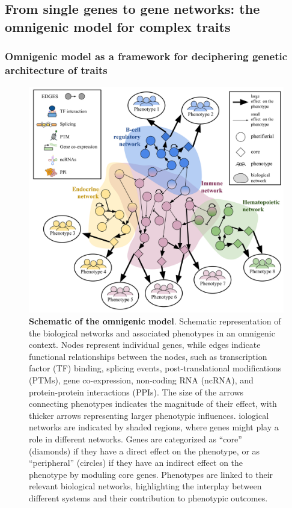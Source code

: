 \hypertarget{from-single-genes-to-gene-networks-the-omnigenic-model-for-complex-traits}{%
\subsection{From single genes to gene networks: the omnigenic model for complex traits}\label{from-single-genes-to-gene-networks-the-omnigenic-model-for-complex-traits}}

\hypertarget{omnigenic-model-as-a-framework-for-deciphering-genetic-architecture-of-traits}{%
\subsubsection{Omnigenic model as a framework for deciphering genetic architecture of traits}\label{omnigenic-model-as-a-framework-for-deciphering-genetic-architecture-of-traits}}

\begin{figure}
\hypertarget{fig:fig2}{%
\centering
\includegraphics[width=1\textwidth,height=\textheight]{images/fig2.svg}
\caption{\textbf{Schematic of the omnigenic model}.
Schematic representation of the biological networks and associated phenotypes in an omnigenic context.
Nodes represent individual genes, while edges indicate functional relationships between the nodes, such as transcription factor (TF) binding, splicing events, post-translational modifications (PTMs), gene co-expression, non-coding RNA (ncRNA), and protein-protein interactions (PPIs).
The size of the arrows connecting phenotypes indicates the magnitude of their effect, with thicker arrows representing larger phenotypic influences.
iological networks are indicated by shaded regions, where genes might play a role in different networks.
Genes are categorized as ``core'' (diamonds) if they have a direct effect on the phenotype, or as ``peripheral'' (circles) if they have an indirect effect on the phenotype by moduling core genes.
Phenotypes are linked to their relevant biological networks, highlighting the interplay between different systems and their contribution to phenotypic outcomes.}\label{fig:fig2}
}
\end{figure}

